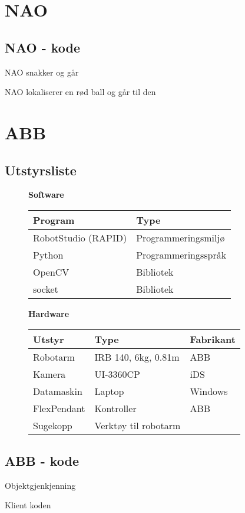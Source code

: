 \section{NAO}
\subsection{NAO - kode}
NAO snakker og går

NAO lokaliserer en rød ball og går til den


\section{ABB}
\subsection{Utstyrsliste}
\begin{figure}[!htb]
    \centering
    \textbf{Software}\par\medskip 
    \begin{tabular}{|l|l|}
        \hline
        \textbf{Program} & \textbf{Type}\\
        \hline
        RobotStudio (RAPID) & Programmeringsmiljø\\
        \hline
        Python & Programmeringsspråk \\
        \hline
        OpenCV & Bibliotek \\
        \hline
        socket & Bibliotek \\
        \hline
    \end{tabular}
    \label{app:soft}
\end{figure}
\begin{figure}[!htb]
    \centering
    \textbf{Hardware}\par\medskip 
    \begin{tabular}{|l|l|l|}
        \hline
        \textbf{Utstyr} & \textbf{Type} & \textbf{Fabrikant}\\
        \hline
        Robotarm & IRB 140, 6kg, 0.81m & ABB\\
        \hline
        Kamera & UI-3360CP & iDS\\
        \hline
        Datamaskin & Laptop & Windows \\
        \hline
        FlexPendant & Kontroller & ABB \\
        \hline
        Sugekopp & Verktøy til robotarm &  \\
        \hline
    \end{tabular}
    \label{app:hard}
\end{figure}

\subsection{ABB - kode}
Objektgjenkjenning

Klient koden

